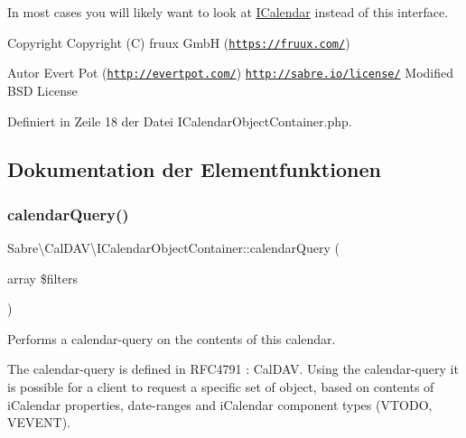 In most cases you will likely want to look at \mbox{\hyperlink{interface_sabre_1_1_cal_d_a_v_1_1_i_calendar}{I\+Calendar}} instead of this interface.

\begin{DoxyCopyright}{Copyright}
Copyright (C) fruux GmbH (\href{https://fruux.com/}{\tt https\+://fruux.\+com/}) 
\end{DoxyCopyright}
\begin{DoxyAuthor}{Autor}
Evert Pot (\href{http://evertpot.com/}{\tt http\+://evertpot.\+com/})  \href{http://sabre.io/license/}{\tt http\+://sabre.\+io/license/} Modified B\+SD License 
\end{DoxyAuthor}


Definiert in Zeile 18 der Datei I\+Calendar\+Object\+Container.\+php.



\subsection{Dokumentation der Elementfunktionen}
\mbox{\label{interface_sabre_1_1_cal_d_a_v_1_1_i_calendar_object_container_abb74b291f0e04c59cf0ca1003d21ba77}} 
\subsubsection{\texorpdfstring{calendar\+Query()}{calendarQuery()}}
{\footnotesize\ttfamily Sabre\textbackslash{}\+Cal\+D\+A\+V\textbackslash{}\+I\+Calendar\+Object\+Container\+::calendar\+Query (\begin{DoxyParamCaption}\item[{array}]{\$filters }\end{DoxyParamCaption})}

Performs a calendar-\/query on the contents of this calendar.

The calendar-\/query is defined in R\+F\+C4791 \+: Cal\+D\+AV. Using the calendar-\/query it is possible for a client to request a specific set of object, based on contents of i\+Calendar properties, date-\/ranges and i\+Calendar component types (V\+T\+O\+DO, V\+E\+V\+E\+NT).

